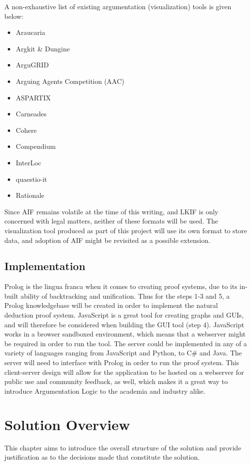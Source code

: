 \documentclass[11pt,twoside,a4paper]{report}
\begin{document}
A non-exhaustive list of existing argumentation (visualization) tools is given below:
\begin{itemize}
\item
Araucaria
\item
Argkit \& Dungine
\item
ArguGRID
\item
Arguing Agents Competition (AAC)
\item
ASPARTIX
\item
Carneades
\item
Cohere
\item
Compendium
\item
InterLoc
\item
quaestio-it
\item
Rationale
\end{itemize}

Since AIF remains volatile at the time of this writing, and LKIF is only concerned with legal matters, neither of these formats will be used. The visualization tool produced as part of this project will use its own format to store data, and adoption of AIF might be revisited as a possible extension.

\section{Implementation}
Prolog is the lingua franca when it comes to creating proof systems, due to its in-built ability of backtracking and unification. Thus for the steps 1-3 and 5, a Prolog knowledgebase will be created in order to implement the natural deduction proof system.
JavaScript is a great tool for creating graphs and GUIs, and will therefore be considered when building the GUI tool (step 4). JavaScript works in a browser sandboxed environment, which means that a webserver might be required in order to run the tool. The server could be implemented in any of a variety of languages ranging from JavaScript and Python, to C\# and Java. The server will need to interface with Prolog in order to run the proof system. 
This client-server design will allow for the application to be hosted on a webserver for public use and community feedback, as well, which makes it a great way to introduce Argumentation Logic to the academia and industry alike.

\chapter{Solution Overview}
\label{chap:solover}
This chapter aims to introduce the overall structure of the solution and provide justification as to the decisions made that constitute the solution.
\end{document}
